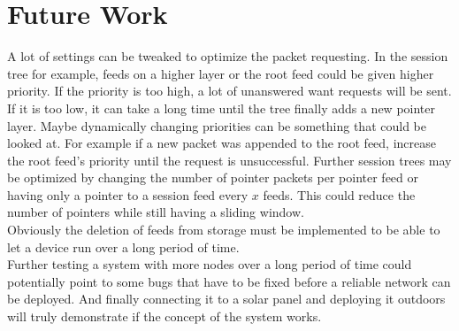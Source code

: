 \section{Future Work}
A lot of settings can be tweaked to optimize the packet requesting. In the session tree for example, feeds on a higher layer or the root feed could be given higher priority. If the priority is too high, a lot of unanswered want requests will be sent. If it is too low, it can take a long time until the tree finally adds a new pointer layer. Maybe dynamically changing priorities can be something that could be looked at. For example if a new packet was appended to the root feed, increase the root feed's priority until the request is unsuccessful. Further session trees may be optimized by changing the number of pointer packets per pointer feed or having only a pointer to a session feed every $x$ feeds. This could reduce the number of pointers while still having a sliding window. \\
Obviously the deletion of feeds from storage must be implemented to be able to let a device run over a long period of time. \\
Further testing a system with more nodes over a long period of time could potentially point to some bugs that have to be fixed before a reliable network can be deployed. And finally connecting it to a solar panel and deploying it outdoors will truly demonstrate if the concept of the system works. \\
